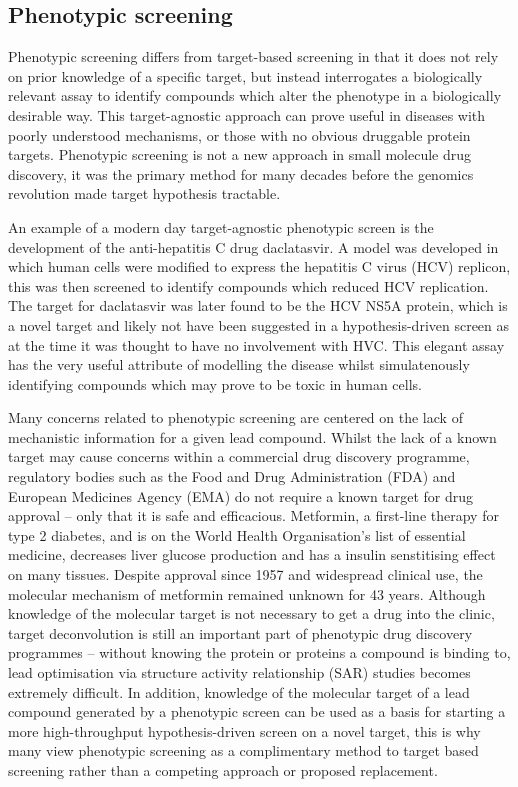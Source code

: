 \documentclass[a4paper,11pt,twoside,openright]{scrbook}
\begin{document}

\subsection{Phenotypic screening}
Phenotypic screening differs from target-based screening in that it does not rely on prior knowledge of a specific target, but instead interrogates a biologically relevant assay to identify compounds which alter the phenotype in a biologically desirable way.
This target-agnostic approach can prove useful in diseases with poorly understood mechanisms, or those with no obvious druggable protein targets.
Phenotypic screening is not a new approach in small molecule drug discovery, it was the primary method for many decades before the genomics revolution made target hypothesis tractable.
\cite{Zheng2013}

An example of a modern day target-agnostic phenotypic screen is the development of the anti-hepatitis C drug daclatasvir.
A model was developed in which human cells were modified to express the hepatitis C virus (HCV) replicon, this was then screened to identify compounds which reduced HCV replication.
The target for daclatasvir was later found to be the HCV NS5A protein, which is a novel target and likely not have been suggested in a hypothesis-driven screen as at the time it was thought to have no involvement with HVC. \cite{Belema2014,Nettles2014}
This elegant assay has the very useful attribute of modelling the disease whilst simulatenously identifying compounds which may prove to be toxic in human cells.

Many concerns related to phenotypic screening are centered on the lack of mechanistic information for a given lead compound.
Whilst the lack of a known target may cause concerns within a commercial drug discovery programme, regulatory bodies such as the Food and Drug Administration (FDA) and European Medicines Agency (EMA) do not require a known target for drug approval -- only that it is safe and efficacious.
Metformin, a first-line therapy for type 2 diabetes, and is on the World Health Organisation's list of essential medicine, decreases liver glucose production and has a insulin senstitising effect on many tissues.
Despite approval since 1957 and widespread clinical use, the  molecular mechanism of metformin remained unknown for 43 years. \cite{Hundal2000}
Although knowledge of the molecular target is not necessary to get a drug into the clinic, target deconvolution is still an important part of phenotypic drug discovery programmes -- without knowing the protein or proteins a compound is binding to, lead optimisation via structure activity relationship (SAR) studies becomes extremely difficult.
In addition, knowledge of the molecular target of a lead compound generated by a phenotypic screen can be used as a basis for starting a more high-throughput hypothesis-driven screen on a novel target, this is why many view phenotypic screening as a complimentary method to target based screening rather than a competing approach or proposed replacement.
\end{document}
